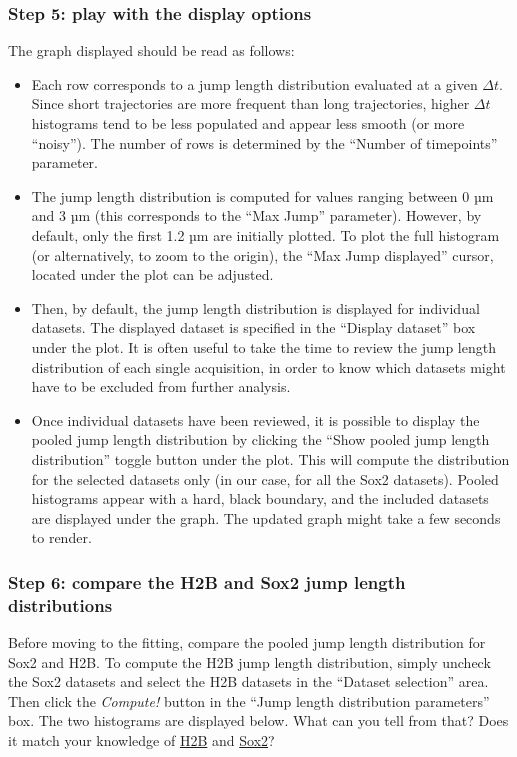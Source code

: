 \subsubsection{Step 5: play with the display options}
The graph displayed should be read as follows:

\begin{itemize}
\item Each row corresponds to a jump length distribution evaluated at a given \(\Delta t\). Since short trajectories are more frequent than long trajectories, higher \(\Delta t\) histograms tend to be less populated and appear less smooth (or more ``noisy''). The number of rows is determined by the ``Number of timepoints'' parameter.
\item The jump length distribution is computed for values ranging between 0 µm and 3 µm (this corresponds to the ``Max Jump'' parameter). However, by default, only the first 1.2 µm are initially plotted. To plot the full histogram (or alternatively, to zoom to the origin), the ``Max Jump displayed'' cursor, located under the plot can be adjusted. 
\item Then, by default, the jump length distribution is displayed for individual datasets. The displayed dataset is specified in the ``Display dataset'' box under the plot. It is often useful to take the time to review the jump length distribution of each single acquisition, in order to know which datasets might have to be excluded from further analysis.
\item Once individual datasets have been reviewed, it is possible to display the pooled jump length distribution by clicking the ``Show pooled jump length distribution'' toggle button under the plot. This will compute the distribution for the selected datasets only (in our case, for all the Sox2 datasets). Pooled histograms appear with a hard, black boundary, and the included datasets are displayed under the graph. The updated graph might take a few seconds to render.

\end{itemize}


\subsubsection{Step 6: compare the H2B and Sox2 jump length distributions}
Before moving to the fitting, compare the pooled jump length distribution for Sox2 and H2B. To compute the H2B jump length distribution, simply uncheck the Sox2 datasets and select the H2B datasets in the ``Dataset selection'' area. Then click the \textit{Compute!} button in the ``Jump length distribution parameters'' box. The two histograms are displayed below. What can you tell from that? Does it match your knowledge of \href{https://en.wikipedia.org/wiki/Histone_H2B}{H2B} and \href{https://en.wikipedia.org/wiki/SOX2}{Sox2}?\\


